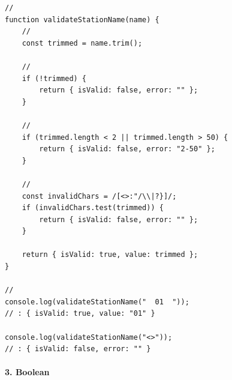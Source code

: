 \important{}

\begin{lstlisting}[style=javascript]
// 
function validateStationName(name) {
    // 
    const trimmed = name.trim();
    
    // 
    if (!trimmed) {
        return { isValid: false, error: "" };
    }
    
    // 
    if (trimmed.length < 2 || trimmed.length > 50) {
        return { isValid: false, error: "2-50" };
    }
    
    // 
    const invalidChars = /[<>:"/\\|?}]/;
    if (invalidChars.test(trimmed)) {
        return { isValid: false, error: "" };
    }
    
    return { isValid: true, value: trimmed };
}

// 
console.log(validateStationName("  01  ")); 
// : { isValid: true, value: "01" }

console.log(validateStationName("<>"));
// : { isValid: false, error: "" }
\end{lstlisting}

\hypertarget{boolean}{%
\paragraph{3. Boolean}\label{boolean}}

